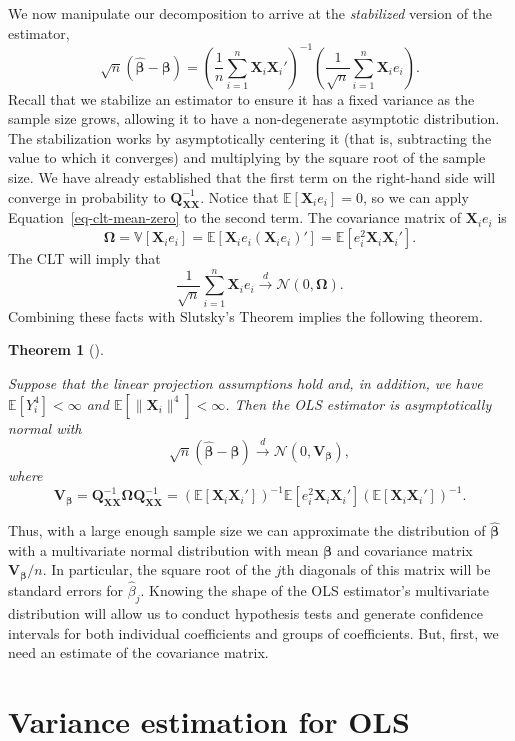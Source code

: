 \documentclass[
  letterpaper,
  DIV=11,
  numbers=noendperiod]{scrreprt}
\newcommand{\mb}{\symbf}
\newcommand{\E}{\mathbb{E}}
\newcommand{\V}{\mathbb{V}}
\newcommand{\N}{\mathcal{N}}
\newcommand{\X}{\mb{X}}
\newcommand{\bfbeta}{\mb{\beta}}
\newcommand{\bhat}{\widehat{\mb{\beta}}}
\newcommand{\indist}{\overset{d}{\to}}
\theoremstyle{plain}
\newtheorem{theorem}{Theorem}[chapter]
\theoremstyle{definition}
\theoremstyle{definition}
\theoremstyle{remark}
\begin{document}
We now manipulate our decomposition to arrive at the \emph{stabilized}
version of the estimator, \[ 
\sqrt{n}\left( \bhat - \bfbeta\right) = \left( \frac{1}{n} \sum_{i=1}^n \X_i\X_i' \right)^{-1} \left( \frac{1}{\sqrt{n}} \sum_{i=1}^n \X_ie_i \right).
\] Recall that we stabilize an estimator to ensure it has a fixed
variance as the sample size grows, allowing it to have a non-degenerate
asymptotic distribution. The stabilization works by asymptotically
centering it (that is, subtracting the value to which it converges) and
multiplying by the square root of the sample size. We have already
established that the first term on the right-hand side will converge in
probability to \(\mb{Q}_{\X\X}^{-1}\). Notice that
\(\E[\X_{i}e_{i}] = 0\), so we can apply Equation~\ref{eq-clt-mean-zero}
to the second term. The covariance matrix of \(\X_ie_{i}\) is \[ 
\mb{\Omega} = \V[\X_{i}e_{i}] = \E[\X_{i}e_{i}(\X_{i}e_{i})'] = \E[e_{i}^{2}\X_{i}\X_{i}'].
\] The CLT will imply that \[ 
\frac{1}{\sqrt{n}} \sum_{i=1}^n \X_ie_i \indist \N(0, \mb{\Omega}).
\] Combining these facts with Slutsky's Theorem implies the following
theorem.

\begin{theorem}[]\protect\hypertarget{thm-ols-asymptotic-normality}{}\label{thm-ols-asymptotic-normality}

Suppose that the linear projection assumptions hold and, in addition, we
have \(\E[Y_{i}^{4}] < \infty\) and
\(\E[\lVert\X_{i}\rVert^{4}] < \infty\). Then the OLS estimator is
asymptotically normal with \[ 
\sqrt{n}\left( \bhat - \bfbeta\right) \indist \N(0, \mb{V}_{\bfbeta}),
\] where \[ 
\mb{V}_{\bfbeta} = \mb{Q}_{\X\X}^{-1}\mb{\Omega}\mb{Q}_{\X\X}^{-1} = \left( \E[\X_i\X_i'] \right)^{-1}\E[e_i^2\X_i\X_i']\left( \E[\X_i\X_i'] \right)^{-1}.
\]

\end{theorem}

Thus, with a large enough sample size we can approximate the
distribution of \(\bhat\) with a multivariate normal distribution with
mean \(\bfbeta\) and covariance matrix \(\mb{V}_{\bfbeta}/n\). In
particular, the square root of the \(j\)th diagonals of this matrix will
be standard errors for \(\widehat{\beta}_j\). Knowing the shape of the
OLS estimator's multivariate distribution will allow us to conduct
hypothesis tests and generate confidence intervals for both individual
coefficients and groups of coefficients. But, first, we need an estimate
of the covariance matrix.

\hypertarget{variance-estimation-for-ols}{%
\section{Variance estimation for
OLS}\label{variance-estimation-for-ols}}
\end{document}
